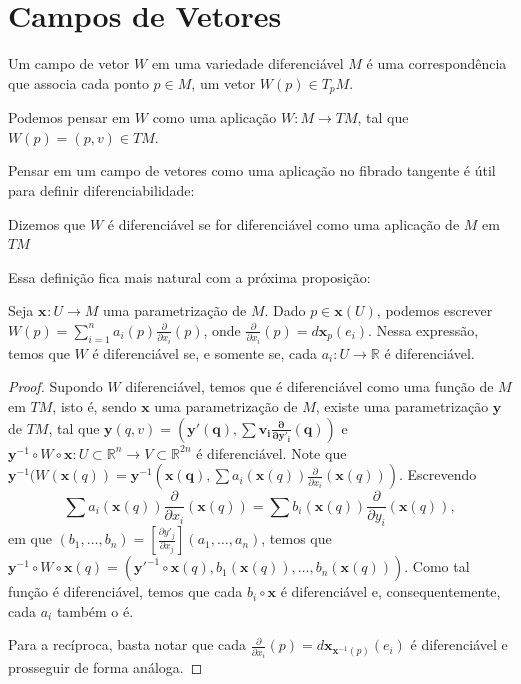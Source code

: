 \section{Campos de Vetores}
\label{loc:campos_de_vetores}
\begin{definition}
    \label{loc:5.1_:_def_8_:_campos_de_vetores.definição}
    Um campo de vetor $W$ em uma variedade diferenciável $M$ é uma correspondência que associa cada ponto $p \in M$, um vetor $W(p) \in T_{p}M$.

    Podemos pensar em $W$ como uma aplicação $W:M\to TM$, tal que $W(p)=(p, v)\in TM$.
\end{definition}
Pensar em um campo de vetores como uma aplicação no fibrado tangente é útil para definir diferenciabilidade:
\begin{definition}
    \label{loc:5.1_:_def_8_:_campos_de_vetores.definição_diferenciabilidade}
    Dizemos que $W$ é diferenciável se for diferenciável como uma aplicação de $M$ em $TM$
\end{definition}
Essa definição fica mais natural com a próxima proposição:
\begin{proposition}
    \label{loc:5.1_:_def_8_:_campos_de_vetores.equivalência_da_diferenciabilidade}
    Seja $\mathbf{x}_{}:U\to M$ uma parametrização de $M$. Dado $p \in \mathbf{x}(U)$, podemos escrever $W(p)=\sum_{i=1}^{n}a_{i}(p)\frac{\partial}{\partial x_{i}}(p)$, onde $\frac{\partial}{\partial x_{i}}(p)=d\mathbf{x}_{p}(e_{i})$. Nessa expressão, temos que $W$ é diferenciável se, e somente se, cada $a_{i}:U\to \mathbb{R}$ é diferenciável.
    \begin{proof}

        Supondo $W$ diferenciável, temos que é diferenciável como uma função de $M$ em $TM$, isto é, sendo $\mathbf{x}$ uma parametrização de $M$, existe uma parametrização $\mathbf{y}$ de $TM$, tal que $\mathbf{y}(q, v)=\left( \mathbf{\mathbf{y}'(q), \sum v_{i}\frac{\partial}{\partial y'_{i}}(q)} \right)$ e $\mathbf{y}^{-1}\circ W \circ \mathbf{x}:U\subset \mathbb{R}^{n}\to V\subset \mathbb{R}^{2n}$ é diferenciável.
        Note que $\mathbf{y}^{-1}(W(\mathbf{x}(q))=\mathbf{y}^{-1}\left( \mathbf{x(q)}, \sum a_{i}(\mathbf{x}(q))\frac{\partial}{\partial x_{i}}(\mathbf{x}(q)) \right)$.
        Escrevendo
        \begin{equation*}
            \sum a_{i}(\mathbf{x}(q))\frac{\partial}{\partial x_{i}}(\mathbf{x}(q))=\sum b_{i}(\mathbf{x}(q))\frac{\partial}{\partial y_{i}}(\mathbf{x}(q)),
        \end{equation*}
        em que $(b_{1}, \dots, b_{n})=\left[ \frac{\partial y'_{j}}{\partial x_{j}} \right](a_{1}, \dots, a_{n})$, temos que $\mathbf{y}^{-1} \circ W \circ \mathbf{x}(q) =(\mathbf{y}'^{-1}\circ \mathbf{x}(q), b_{1}(\mathbf{x}(q)), \dots, b_{n}(\mathbf{x}(q)))$. Como tal função é diferenciável, temos que cada $b_{i} \circ \mathbf{x}$ é diferenciável e, consequentemente, cada $a_{i}$ também o é.

        Para a recíproca, basta notar que cada $\frac{\partial}{\partial x_{i}}(p)=d\mathbf{x}_{\mathbf{x}^{-1}(p)}(e_{i})$ é diferenciável e prosseguir de forma análoga.
    \end{proof}
\end{proposition}
